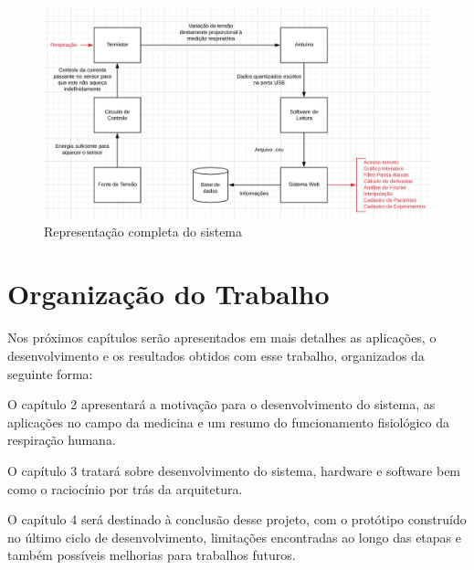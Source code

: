 		\begin{figure}[h!]
			\begin{center}
				\includegraphics[width=1\linewidth]{images/fluxo_sistema.png}
				\caption{Representação completa do sistema}
				\label{fig:fluxo_sistema}
			\end{center}
		\end{figure}
		
	
	\section{Organização do Trabalho}
	
		Nos próximos capítulos serão apresentados em mais detalhes as aplicações, o desenvolvimento e os resultados obtidos com esse trabalho, organizados da seguinte forma:
		
		O capítulo 2 apresentará a motivação para o desenvolvimento do sistema, as aplicações no campo da medicina e um resumo do funcionamento fisiológico da respiração humana. 
		
		O capítulo 3 tratará sobre desenvolvimento do sistema, hardware e software bem como o raciocínio por trás da arquitetura.
		
		O capítulo 4 será destinado à conclusão desse projeto, com o protótipo construído no último ciclo de desenvolvimento, limitações encontradas ao longo das etapas e também possíveis melhorias para trabalhos futuros.

